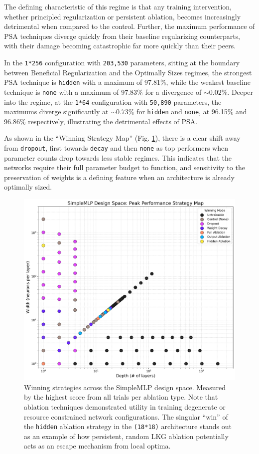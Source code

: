 \documentclass[conference]{IEEEtran}
\begin{document}
The defining characteristic of this regime is that any training intervention, whether principled regularization or persistent ablation, becomes increasingly detrimental when compared to the control. Further, the maximum performance of PSA techniques diverge quickly from their baseline regularizing counterparts, with their damage becoming catastrophic far more quickly than their peers. 

In the \verb|1*256| configuration with \verb|203,530| parameters, sitting at the boundary between Beneficial Regularization and the Optimally Sizes regimes, the strongest PSA technique is \verb|hidden| with a maximum of 97.81\%, while the weakest baseline technique is \verb|none| with a maximum of 97.83\% for a divergence of $\sim0.02\%$. Deeper into the regime, at the \verb|1*64| configuration with \verb|50,890| parameters, the maximums diverge significantly at $\sim0.73\%$ for \verb|hidden| and \verb|none|, at 96.15\% and 96.86\% respectively, illustrating the detrimental effects of PSA.

As shown in the ``Winning Strategy Map'' (Fig. \ref{fig:heatmap_winning}), there is a clear shift away from \verb|dropout|, first towards \verb|decay| and then \verb|none| as top performers when parameter counts drop towards less stable regimes. This indicates that the networks require their full parameter budget to function, and sensitivity to the preservation of weights is a defining feature when an architecture is already optimally sized.

\begin{figure}[ht]
\centering
\includegraphics[width=\linewidth]{SimpleMLP_Heatmap_Winning_Strategy.png}
\caption{Winning strategies across the SimpleMLP design space. Measured by the highest score from all trials per ablation type. Note that ablation techniques demonstrated utility in training degenerate or resource constrained network configurations. The singular ``win'' of the \texttt{hidden} ablation strategy in the \texttt{(18*18)} architecture stands out as an example of how persistent, random LKG ablation potentially acts as an escape mechanism from local optima.}
\label{fig:heatmap_winning}
\end{figure}
\end{document}
